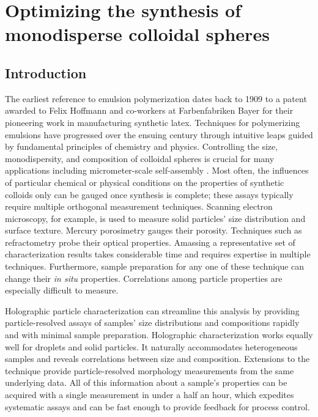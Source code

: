 \chapter{Optimizing the synthesis of monodisperse colloidal spheres}
\label{ch:synthesis}

\section{Introduction}

The earliest reference to emulsion polymerization dates back to
1909 \cite{bayer1909,finch03} to a patent awarded to Felix Hoffmann and
co-workers at Farbenfabriken Bayer for their pioneering work in manufacturing
synthetic latex.
Techniques for polymerizing emulsions have progressed  over the ensuing century
through intuitive leaps guided by fundamental principles of chemistry
and physics.  Controlling the size, monodispersity, and composition of
colloidal spheres is crucial for many applications including micrometer-scale
self-assembly \cite{pusey87,sacanna11}. Most often, the influences of particular chemical
or physical conditions on the properties of synthetic colloids only can be gauged once
synthesis is complete; these assays typically require multiple orthogonal measurement
techniques.
Scanning electron microscopy, for example, is used to measure solid particles'
size distribution and surface texture. Mercury porosimetry gauges their
porosity. Techniques such as refractometry probe their optical properties.
Amassing a representative set of characterization results takes considerable
time and requires
expertise in multiple techniques. Furthermore, sample preparation for any one
of these technique can change their \emph{in situ} properties.
Correlations among particle properties are especially difficult to measure.

Holographic particle characterization can streamline this analysis by providing
particle-resolved assays of samples' size distributions and compositions rapidly and with
minimal sample preparation. Holographic characterization works equally
well for droplets and solid particles. It naturally accommodates heterogeneous
samples and reveals correlations between size and composition. Extensions to the technique
provide particle-resolved morphology measurements from the same underlying data.
All of this information about a sample's properties can be acquired with a
single measurement in under a half an hour, which
expedites systematic assays and can be fast enough to provide feedback
for process control.

